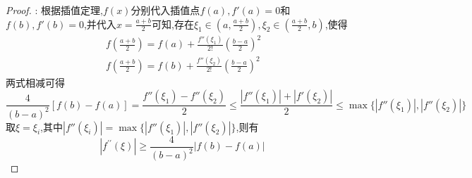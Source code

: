 \documentclass[lang=cn,newtx,10pt,scheme=chinese]{../Template/elegantbook}
\begin{document}
\begin{exercise}
\begin{proof}
    {\color{blue} }:
    根据插值定理,$f(x)$分别代入插值点$f(a),f'(a)=0$和$f(b),f'(b)=0$,并代入$x=\frac{a+b}{2}$可知,存在$\xi_1\in(a,\frac{a+b}{2}),\xi_2\in(\frac{a+b}{2},b)$,使得
    \begin{gather}
    f(\frac{a+b}{2})=f(a)+\frac{f''(\xi_1)}{2!}(\frac{b-a}{2})^2
    \nonumber
    \\
    f(\frac{a+b}{2})=f(b)+\frac{f''(\xi_2)}{2!}(\frac{b-a}{2})^2
    \nonumber
    \end{gather}
    两式相减可得
    \begin{equation}
    \frac{4}{(b-a)^2}[f(b)-f(a)]=\frac{f''(\xi_1)-f''(\xi_2)}{2}\leqslant \frac{|f''(\xi_1)|+|f'(\xi_2)|}{2}\leqslant \max\{|f''(\xi_1)|,|f''(\xi_2)|\}
        \nonumber
    \end{equation}
    取$\xi=\xi_i$,其中$|f''(\xi_i)|= \max\{|f''(\xi_1)|,|f''(\xi_2)|\}$,则有
    \begin{equation}
\left| f^{\prime\prime}(\xi ) \right|\geqslant \frac{4}{(b-a)^2}\left| f(b)-f(a) \right|\
        \nonumber
    \end{equation}
    
\end{proof}
\end{exercise}
\end{document}
